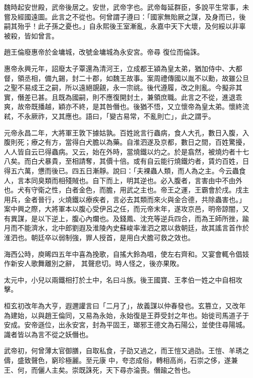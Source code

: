 \begin{pinyinscope}
 魏時起安世殿，武帝後居之。安世，武帝字也。武帝每延群臣，多說平生常事，未嘗及經國遠圖。此言之不從也。何曾謂子遵曰：「國家無貽厥之謀，及身而已，後嗣其殆乎！此子孫之憂也。」自永熙後王室漸亂，永嘉中天下大壞，及何綏以非辜被殺，皆如曾言。



 趙王倫廢惠帝於金墉城，改號金墉城為永安宮。帝尋
 復位而倫誅。



 惠帝永興元年，詔廢太子覃還為清河王，立成都王潁為皇太弟，猶加侍中、大都督，領丞相，備九錫，封二十郡，如魏王故事。案周禮傳國以胤不以勳，故雖公旦之聖不易成王之嗣，所以遠絕覬覦，永一宗祧。後代遵履，改之則亂。今擬非其實，僭差已甚。且既為國嗣，則不應復開封土，兼領庶職。此言之不從，進退乖爽，故帝既播越，穎亦不終，是其咎僭也。後猶不悟，又立懷帝為皇太弟。懷終流弒，不永厥祚，又其應也。語曰，「變古易常，不亂則亡」，此之謂乎。



 元帝永昌二年，大將軍王敦下據姑孰。百姓訛言行蟲病，食人大孔，數日入腹，入腹則死；療之有方，當得白犬膽以為藥。自淮泗遂及京都，數日之間，百姓驚擾，人人皆自云已得蟲病。又云，始在外時，當燒鐵以灼之。於是翕然，被燒灼者十七八矣。而白犬暴貴，至相請奪，其價十倍。或有自云能行燒鐵灼者，賃灼百姓，日得五六萬，憊而後已。四五日漸靜。說曰：「夫裸蟲人類，而人為之主。今云蟲食人，言本同臭類而相殘賊也。自下而上，明其逆也。必入腹者，言害由中不由外也。犬有守衛之性，白者金色，而膽，用武之主也。帝王之運，王霸會於戌。戌主
 用兵，金者晉行，火燒鐵以療疾者，言必去其類而來火與金合德，共除蟲害也。」案中興之際，大將軍本以腹心受伊呂之任，而元帝末年，遂攻京邑，明帝諒闇，又有異謀，是以下逆上，腹心內爛也。及錢鳳、沈充等逆兵四合，而為王師所挫，踰月而不能濟水，北中郎劉遐及淮陵內史蘇峻率淮泗之眾以救朝廷，故其謠言首作於淮泗也。朝廷卒以弱制強，罪人授首，是用白犬膽可救之效也。



 海西公時，庾晞四五年中喜為挽歌，自搖大鈴為唱，使左右齊和。又宴會輒令倡妓作新安人歌舞離別之辭，
 其聲悲切。時人怪之，後亦果敗。



 太元中，小兒以兩鐵相打於土中，名曰斗族。後王國寶、王孝伯一姓之中自相攻擊。



 桓玄初改年為大亨，遐邇讙言曰「二月了」，故義謀以仲春發也。玄篡立，又改年為建始，以與趙王倫同，又易為永始，永始復是王莽受封之年也。始徙司馬道子于安成。安帝遜位，出永安宮，封為平固王，瑯邪王德文為石陽公，並使住尋陽城。識者皆以為言不從之妖僭也。



 武帝初，何曾薄太官御膳，自取私食，子劭又過之，而王愷又過劭。王愷、羊琇之儔，盛致聲色，窮珍極麗。至元康
 中，夸恣成俗，轉相高尚，石崇之侈，遂兼王、何，而儷人主矣。崇既誅死，天下尋亦淪喪。僭踰之咎也。




\end{pinyinscope}

